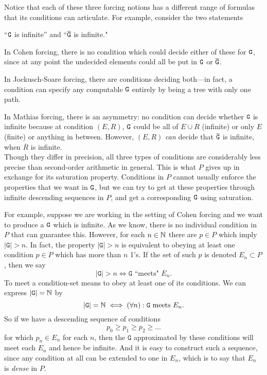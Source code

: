 \documentclass{amsart}
\begin{document}
	Notice that each of these three forcing notions has a different range of formulas that its conditions can articulate. For example, consider the two statements 
	\begin{center}``$\tt{G}$ is infinite'' and ``$\overline{\tt{G}}$ is infinite."\end{center}
	
	In Cohen forcing, there is no condition which could decide either of these for $\tt{G}$, since at any point the undecided elements could all be put in $\tt{G}$ or $\overline{\tt{G}}$. 
	
	In Jockusch-Soare forcing, there are conditions deciding both---in fact, a condition can specify any computable $\tt{G}$ entirely by being a tree with only one path.
	
	In Mathias forcing, there is an asymmetry: no condition can decide whether $\tt{G}$ is infinite because at condition $(E,R)$, $\tt{G}$ could be all of $E\cup R$ (infinite) or only $E$ (finite) or anything in between. However, $(E,R)$ \textit{can} decide that $\overline{\tt{G}}$ is infinite, when $\overline{R}$ is infinite.\\
	
	Though they differ in precision, all three types of conditions are considerably less precise than second-order arithmetic in general. This is what $P$ gives up in exchange for its saturation property. Conditions in $P$ cannot usually enforce the properties that we want in $\tt{G}$, but we can try to get at these properties through infinite descending sequences in $P$, and get a corresponding $\tt{G}$ using saturation.
	
	For example, suppose we are working in the setting of Cohen forcing and we want to produce a $\tt{G}$ which is infinite. As we know, there is no individual condition in $P$ that can guarantee this. However, for each $n\in\mathbb{N}$ there are $p\in P$ which imply $|\mathtt{G}|>n$. In fact, the property $|\mathtt{G}|>n$ is equivalent to obeying at least one condition $p\in P$ which has more than $n$ 1's. If the set of such $p$ is denoted $E_n\subset P$, then we say
	$$
	|\mathtt{G}|>n \iff \mathtt{G} \text{ ``meets" } E_n.
	$$
	To meet a condition-set means to obey at least one of its conditions. We can express $|\mathtt{G}|=\mathbb{N}$ by
	$$
	|\mathtt{G}|=\mathbb{N}  \iff (\forall n): \mathtt{G} \text{ meets } E_n.
	$$
	So if we have a descending sequence of conditions 
	$$
	p_0\geq p_1 \geq p_2 \geq \dots
	$$
	for which $p_n\in E_n$ for each $n$, then the $\mathtt{G}$ approximated by these conditions will meet each $E_n$ and hence be infinite. And it is easy to construct such a sequence, since any condition at all can be extended to one in $E_n$, which is to say that $E_n$ is \textit{dense} in $P$.\\
	
\end{document}
